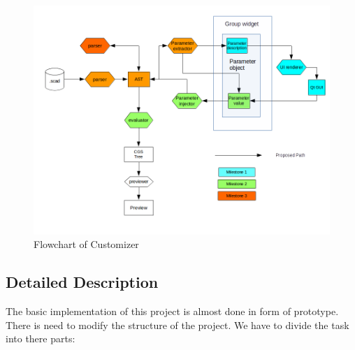\begin{figure}
    \centering \includegraphics[scale=0.6]{images/flowchart.png}
    \caption{Flowchart of Customizer}
    \label{fig:FD1}
\end{figure}

\subsection{Detailed Description}

The basic implementation of this project is almost done in form of prototype. There is need to modify the structure of the project. We have to divide the task into there parts:

